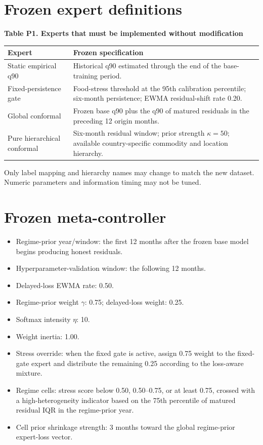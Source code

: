 \documentclass[11pt,a4paper]{article}
\begin{document}
\section{Frozen expert definitions}\label{frozen-expert-definitions}

\textbf{Table P1. Experts that must be implemented without modification}

\begin{longtable}[]{@{}p{}p{}@{}}
\toprule
\textbf{Expert} & \textbf{Frozen specification} \\
\midrule
\endhead
\bottomrule
\endlastfoot
Static empirical q90 & Historical q90 estimated through the end of the base-training period. \\
Fixed-persistence gate & Food-stress threshold at the 95th calibration percentile; six-month persistence; EWMA residual-shift rate 0.20. \\
Global conformal & Frozen base q90 plus the q90 of matured residuals in the preceding 12 origin months. \\
Pure hierarchical conformal & Six-month residual window; prior strength \(\kappa=50\); available country-specific commodity and location hierarchy. \\
\end{longtable}

Only label mapping and hierarchy names may change to match the new dataset. Numeric parameters and information timing may not be tuned.

\section{Frozen meta-controller}\label{frozen-meta-controller}

\begin{itemize}
\item Regime-prior year/window: the first 12 months after the frozen base model begins producing honest residuals.
\item Hyperparameter-validation window: the following 12 months.
\item Delayed-loss EWMA rate: 0.50.
\item Regime-prior weight \(\gamma\): 0.75; delayed-loss weight: 0.25.
\item Softmax intensity \(\eta\): 10.
\item Weight inertia: 1.00.
\item Stress override: when the fixed gate is active, assign 0.75 weight to the fixed-gate expert and distribute the remaining 0.25 according to the loss-aware mixture.
\item Regime cells: stress score below 0.50, 0.50--0.75, or at least 0.75, crossed with a high-heterogeneity indicator based on the 75th percentile of matured residual IQR in the regime-prior year.
\item Cell prior shrinkage strength: 3 months toward the global regime-prior expert-loss vector.
\end{itemize}
\end{document}

